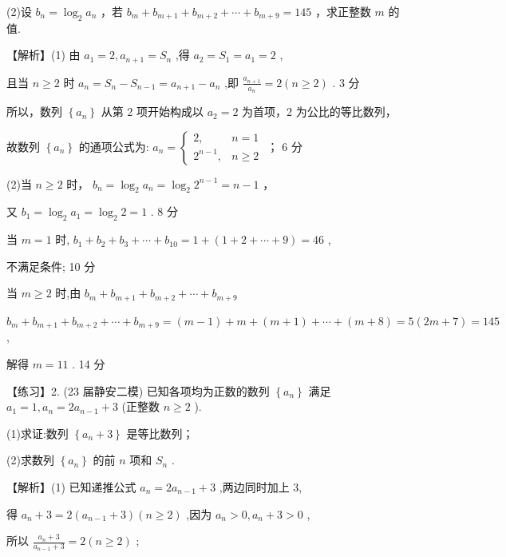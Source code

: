 \documentclass[10pt]{article}
\begin{document}
(2)设 \({b}_{n} = {\log }_{2}{a}_{n}\) ，若 \({b}_{m} + {b}_{m + 1} + {b}_{m + 2} + \cdots  + {b}_{m + 9} = {145}\) ，求正整数 \(m\) 的值.

【解析】(1) 由 \({a}_{1} = 2,{a}_{n + 1} = {S}_{n}\) ,得 \({a}_{2} = {S}_{1} = {a}_{1} = 2\) ,

且当 \(n \geq  2\) 时 \({a}_{n} = {S}_{n} - {S}_{n - 1} = {a}_{n + 1} - {a}_{n}\) ,即 \(\frac{{a}_{n + 1}}{{a}_{n}} = 2\left( {n \geq  2}\right)\) . 3 分

所以，数列 \(\left\{  {a}_{n}\right\}\) 从第 2 项开始构成以 \({a}_{2} = 2\) 为首项，2 为公比的等比数列，

故数列 \(\left\{  {a}_{n}\right\}\) 的通项公式为: \({a}_{n} = \left\{  \begin{array}{ll} 2, & n = 1 \\  {2}^{n - 1}, & n \geq  2 \end{array}\right.\) ； 6 分

(2)当 \(n \geq  2\) 时， \({b}_{n} = {\log }_{2}{a}_{n} = {\log }_{2}{2}^{n - 1} = n - 1\) ，

又 \({b}_{1} = {\log }_{2}{a}_{1} = {\log }_{2}2 = 1\) . 8 分

当 \(m = 1\) 时, \({b}_{1} + {b}_{2} + {b}_{3} + \cdots  + {b}_{10} = 1 + \left( {1 + 2 + \cdots  + 9}\right)  = {46}\) ,

不满足条件; 10 分

当 \(m \geq  2\) 时,由 \({b}_{m} + {b}_{m + 1} + {b}_{m + 2} + \cdots  + {b}_{m + 9}\)

\({b}_{m} + {b}_{m + 1} + {b}_{m + 2} + \cdots  + {b}_{m + 9} = \left( {m - 1}\right)  + m + \left( {m + 1}\right)  + \cdots  + \left( {m + 8}\right)  = 5\left( {{2m} + 7}\right)  = {145}\) ,

解得 \(m = {11}\) . 14 分

【练习】2. (23 届静安二模) 已知各项均为正数的数列 \(\left\{  {a}_{n}\right\}\) 满足 \({a}_{1} = 1,{a}_{n} = 2{a}_{n - 1} + 3\) (正整数 \(n \geq  2\) ).

(1)求证:数列 \(\left\{  {{a}_{n} + 3}\right\}\) 是等比数列；

(2)求数列 \(\left\{  {a}_{n}\right\}\) 的前 \(n\) 项和 \({S}_{n}\) .

【解析】(1) 已知递推公式 \({a}_{n} = 2{a}_{n - 1} + 3\) ,两边同时加上 3,

得 \({a}_{n} + 3 = 2\left( {{a}_{n - 1} + 3}\right) \left( {n \geq  2}\right)\) ,因为 \({a}_{n} > 0,{a}_{n} + 3 > 0\) ,

所以 \(\frac{{a}_{n} + 3}{{a}_{n - 1} + 3} = 2\left( {n \geq  2}\right)\) ;
\end{document}
